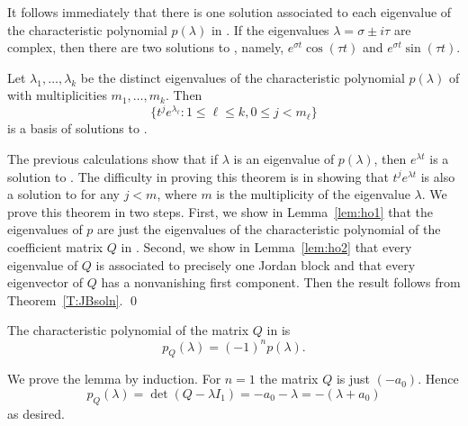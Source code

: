 \documentclass{ximera}
\begin{document}
It follows immediately that there is one solution associated to 
each eigenvalue of the characteristic polynomial $p(\lambda)$ in 
.  If the eigenvalues $\lambda=\sigma\pm i\tau$ are complex, 
then there are two solutions to , namely,
$e^{\sigma t}\cos(\tau t)$ and $e^{\sigma t}\sin(\tau t)$.
\begin{thm} \label{T:hoe}
Let $\lambda_1,\ldots,\lambda_k$ be the distinct eigenvalues of the 
characteristic 
polynomial 
$p(\lambda)$ of  with multiplicities 
$m_1,\ldots,m_k$.  Then 
\[
\{t^je^{\lambda_\ell}: 1\leq\ell\leq k, 0\leq j<m_\ell\}
\]
is a basis of solutions to .
\end{thm} 

\proof  The previous calculations show that if $\lambda$ is an eigenvalue 
of $p(\lambda)$, then $e^{\lambda t}$ is a solution to .  
The difficulty in proving this theorem is in showing that $t^je^{\lambda t}$ 
is also a solution to  for any $j<m$, where $m$ is the 
multiplicity of the eigenvalue $\lambda$.  We prove this theorem in two steps.
First, we show in Lemma~\ref{lem:ho1} that the eigenvalues of $p$ are just the 
eigenvalues of the characteristic polynomial of the coefficient matrix $Q$ in 
.  Second, we show in Lemma~\ref{lem:ho2} that every eigenvalue 
of $Q$ is associated to precisely one Jordan block and that
every eigenvector of $Q$ has a nonvanishing first component. 
Then the result follows from Theorem~\ref{T:JBsoln}.  \qed

\begin{lemma}  \label{lem:ho1}
The characteristic polynomial of 
the matrix $Q$ in  is 
\[
p_Q(\lambda) = (-1)^np(\lambda).
\]
\end{lemma}

\proof We prove the lemma by induction.
For $n=1$ the matrix $Q$ is just $(-a_0)$.  Hence
\[
p_Q(\lambda)=\det(Q-\lambda I_1) = -a_0-\lambda = -(\lambda+a_0)
\]
as desired.
\end{document}
